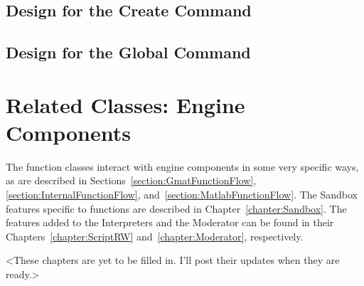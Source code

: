\subsection{\label{section:CreateCommandDesign}Design for the Create Command}



\subsection{\label{section:GlobalCommandDesign}Design for the Global Command}



\section{Related Classes: Engine Components}

The function classes interact with engine components in some very specific ways, as are described
in Sections~\ref{section:GmatFunctionFlow}, \ref{section:InternalFunctionFlow},
and~\ref{section:MatlabFunctionFlow}.  The Sandbox features specific to functions are described in
Chapter~\ref{chapter:Sandbox}.  The features added to the Interpreters and the Moderator can be
found in their Chapters~\ref{chapter:ScriptRW} and~\ref{chapter:Moderator}, respectively.

<These chapters are yet to be filled in.  I'll post their updates when they are ready.>


